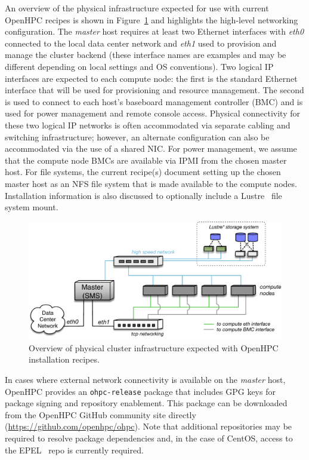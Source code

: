 \documentclass{sig-alternate-05-2015}
\begin{document}
An overview of the physical infrastructure expected for use with
current OpenHPC recipes is shown in
Figure~\ref{fig:cluster_arch} and highlights the high-level networking
configuration. The {\em master} host requires at least two Ethernet interfaces
with {\em eth0} connected to the local data center network and {\em eth1} used
to provision and manage the cluster backend (these interface names
are examples and may be different depending on local settings and OS
conventions). Two logical IP interfaces are expected to each compute node: the
first is the standard Ethernet interface that will be used for provisioning and
resource management. The second is used to connect to each host's baseboard
management controller (BMC) and is
used for power management and remote console access. Physical connectivity for
these two logical IP networks is often accommodated via separate cabling and
switching infrastructure; however, an alternate configuration can also be
accommodated via the use of a shared NIC.
For power management, we assume that the compute node 
BMCs are available via IPMI from the chosen master host. For file
systems, the current recipe(s) document setting up the chosen master
host as an NFS file system that is made available to the compute
nodes. Installation information is also discussed to optionally include a
Lustre~\cite{Lustre_url} file system mount.

\begin{figure}[h]
  \includegraphics[width=0.95\linewidth]{figures/ohpc-arch-small.pdf}
  \caption{Overview of physical cluster infrastructure expected with OpenHPC
    installation recipes.}
  \label{fig:cluster_arch}
\end{figure}

 In cases where external network connectivity is
available on the {\em master} host, OpenHPC provides an \texttt{ohpc-release}
package that includes GPG keys for package signing and repository enablement.
This package can be downloaded from the OpenHPC GitHub community site directly
(\url{https://github.com/openhpc/ohpc}). Note that additional repositories may
be required to resolve package dependencies and, in the case of CentOS, access
to the EPEL~\cite{epel_url} repo is currently required.
\end{document}

